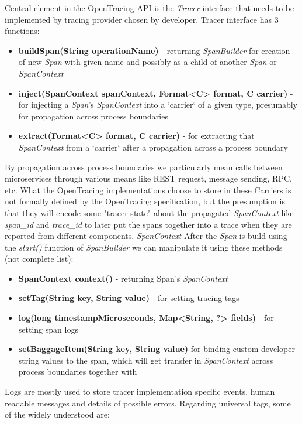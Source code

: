 \documentclass[12pt,oneside]{fithesis2}
\begin{document}
Central element in the OpenTracing API is the \textit{Tracer} interface that needs to be implemented by tracing provider chosen by developer. Tracer interface has 3 functions:

\begin{itemize}
\item \textbf{buildSpan(String operationName)} - returning \textit{SpanBuilder} for creation of new \textit{Span} with given name and possibly as a child of another \textit{Span} or \textit{SpanContext}
\item \textbf{inject(SpanContext spanContext, Format<C> format, C carrier)} - for injecting a \textit{Span}'s \textit{SpanContext} into a `carrier` of a given type, presumably for propagation across process boundaries
\item \textbf{extract(Format<C> format, C carrier)} - for extracting that \textit{SpanContext} from a `carrier` after a propagation across a process boundary
\end{itemize}

By propagation across process boundaries we particularly mean calls between microservices through various means like REST request, message sending, RPC, etc. What the OpenTracing implementations choose to store in these Carriers is not formally defined by the OpenTracing specification, but the presumption is that they will encode some "tracer state" about the propagated \textit{SpanContext} like \textit{span\_id} and \textit{trace\_id} to later put the spans together into a trace when they are reported from different components. \textit{SpanContext} After the \textit{Span} is build using the \textit{start()} function of \textit{SpanBuilder} we can manipulate it using these methods (not complete list):

\begin{itemize}
\item \textbf{SpanContext context()} - returning Span's \textit{SpanContext}
\item \textbf{setTag(String key, String value)} - for setting tracing tags
\item \textbf{log(long timestampMicroseconds, Map<String, ?> fields)} - for setting span logs
\item \textbf{setBaggageItem(String key, String value)} for binding custom developer string values to the span, which will get transfer in \textit{SpanContext} across process boundaries together with 
\end{itemize}
\newpage

Logs are mostly used to store tracer implementation specific events, human readable messages and details of possible errors. Regarding universal tags, some of the widely understood are\cite{opentracing_spec}:
\end{document}
